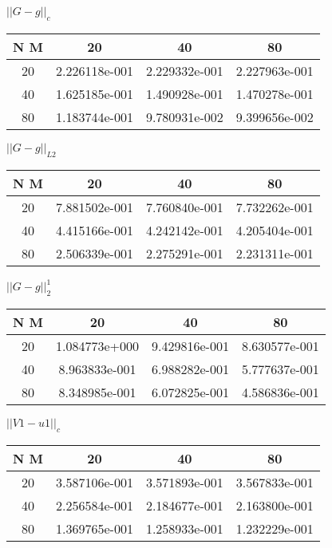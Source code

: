 \begin{center}
	$||G - g||_c$
	\begin{tabular}{|c|c|c|c|}
		\hline 
		N  M& 20& 40& 80\\ 
		\hline 
		20 & 2.226118e-001 & 2.229332e-001 & 2.227963e-001 \\ \hline 
		40 & 1.625185e-001 & 1.490928e-001 & 1.470278e-001 \\ \hline 
		80 & 1.183744e-001 & 9.780931e-002 & 9.399656e-002 \\ \hline 
		\hline 
	\end{tabular} 
\end{center} 
\begin{center}
	$||G - g||_{L2}$
	\begin{tabular}{|c|c|c|c|}
		\hline 
		N  M& 20& 40& 80\\ 
		\hline 
		20 & 7.881502e-001 & 7.760840e-001 & 7.732262e-001 \\ \hline 
		40 & 4.415166e-001 & 4.242142e-001 & 4.205404e-001 \\ \hline 
		80 & 2.506339e-001 & 2.275291e-001 & 2.231311e-001 \\ \hline 
		\hline 
	\end{tabular} 
\end{center} 
\begin{center}
	$||G - g||_{2}^1$
	\begin{tabular}{|c|c|c|c|}
		\hline 
		N  M& 20& 40& 80\\ 
		\hline 
		20 & 1.084773e+000 & 9.429816e-001 & 8.630577e-001 \\ \hline 
		40 & 8.963833e-001 & 6.988282e-001 & 5.777637e-001 \\ \hline 
		80 & 8.348985e-001 & 6.072825e-001 & 4.586836e-001 \\ \hline 
		\hline 
	\end{tabular} 
\end{center} 
\begin{center}
	$||V1 - u1||_c$
	\begin{tabular}{|c|c|c|c|}
		\hline 
		N  M& 20& 40& 80\\ 
		\hline 
		20 & 3.587106e-001 & 3.571893e-001 & 3.567833e-001 \\ \hline 
		40 & 2.256584e-001 & 2.184677e-001 & 2.163800e-001 \\ \hline 
		80 & 1.369765e-001 & 1.258933e-001 & 1.232229e-001 \\ \hline 
		\hline 
	\end{tabular} 
\end{center} 
